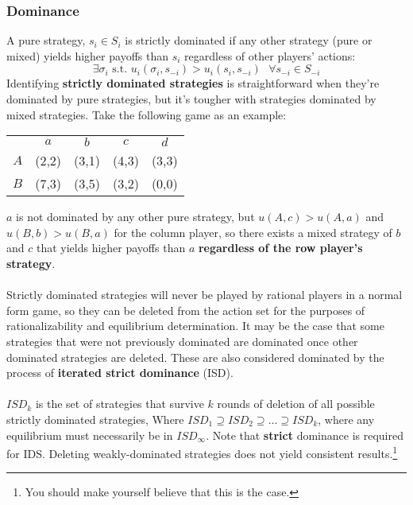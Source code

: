 \documentclass{article}
\newcommand{\contains}{\supseteq}
\begin{document}
\subsubsection{Dominance}
A pure strategy, ${s_i\in S_i}$ is strictly dominated if any other strategy (pure or mixed) yields higher payoffs than $s_i$ regardless of other players' actions:
\[
	\exists \sigma_i\text{ s.t. } u_i(\sigma_i,s_{-i}) > u_i(s_i,s_{-i})\text{ }\forall s_{-i}\in S_{-i}
\]
Identifying \textbf{strictly dominated strategies} is straightforward when they're dominated by pure strategies, but it's tougher with strategies dominated by mixed strategies. Take the following game as an example:
\begin{center}
	\begin{tabular}{r c c c c }
		& $a$ 							& $b$ 							& $c$ 							& $d$							\\ \cline{2-5}
	$A$ & \multicolumn{1}{|c|}{(2,2)} 	& \multicolumn{1}{|c|}{(3,1)} 	& \multicolumn{1}{|c|}{(4,3)} 	& \multicolumn{1}{|c|}{(3,3)} 	\\ \cline{2-5}
	$B$ & \multicolumn{1}{|c|}{(7,3)} 	& \multicolumn{1}{|c|}{(3,5)} 	& \multicolumn{1}{|c|}{(3,2)} 	& \multicolumn{1}{|c|}{(0,0)} 	\\ \cline{2-5}
	\end{tabular}
\end{center}
$a$ is not dominated by any other pure strategy, but ${u(A,c)>u(A,a)}$ and ${u(B,b)>u(B,a)}$ for the column player, so there exists a mixed strategy of $b$ and $c$ that yields higher payoffs than $a$ \textbf{regardless of the row player's strategy}.\\
\\
Strictly dominated strategies will never be played by rational players in a normal form game, so they can be deleted from the action set for the purposes of rationalizability and equilibrium determination. It may be the case that some strategies that were not previously dominated are dominated once other dominated strategies are deleted. These are also considered dominated by the process of \textbf{iterated strict dominance} (ISD). \\
\\
$ISD_k$ is the set of strategies that survive $k$ rounds of deletion of all possible strictly dominated strategies, Where ${ISD_1\contains ISD_2\contains...\contains ISD_k}$, where any equilibrium must necessarily be in $ISD_\infty$. Note that \textbf{strict} dominance is required for IDS. Deleting weakly-dominated strategies does not yield consistent results.\footnote{You should make yourself believe that this is the case.}
\end{document}
